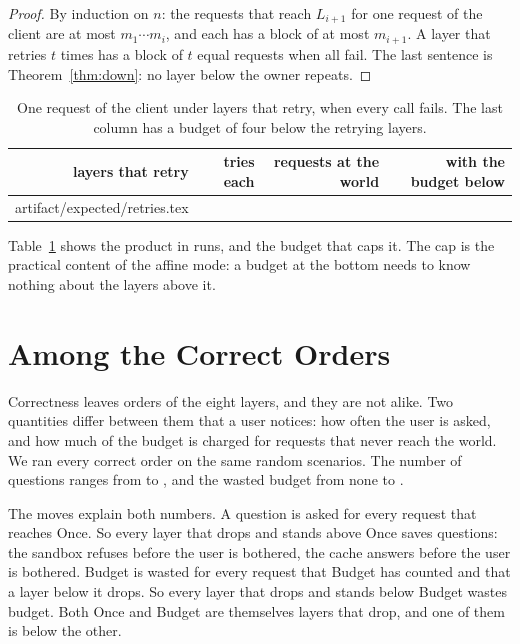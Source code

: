 \documentclass[acmsmall,nonacm,screen]{acmart}
\makeatletter
\newcommand{\ly}[1]{\textsf{#1}}
\newcommand{\claim}[2]{#2}
\newcommand{\rows}[1]{\@@input artifact/expected/#1.tex }
\makeatother
\begin{document}
\begin{proof}
By induction on $n$: the requests that reach $L_{i+1}$ for one request of the client are at
most $m_1 \cdots m_i$, and each has a block of at most $m_{i+1}$. A layer that retries $t$
times has a block of $t$ equal requests when all fail. The last sentence is
Theorem~\ref{thm:down}: no layer below the owner repeats.
\end{proof}

\begin{table}
\caption{One request of the client under layers that retry, when every call fails. The last
column has a budget of four below the retrying layers.}
\label{tab:retries}
\begin{tabular}{rrrr}
\toprule
layers that retry & tries each & requests at the world & with the budget below \\
\midrule
\rows{retries}
\bottomrule
\end{tabular}
\end{table}

\claim{retries-multiply}{Table~\ref{tab:retries} shows the product in runs, and the budget
that caps it.} The cap is the practical content of the affine mode: a budget at the bottom
needs to know nothing about the layers above it.

\section{Among the Correct Orders}
\label{sec:cost}

Correctness leaves \exEightGood{} orders of the eight layers, and they are not alike. Two
quantities differ between them that a user notices: how often the user is asked, and how
much of the budget is charged for requests that never reach the world. We ran every correct
order on the same \exWork{} random scenarios. The number of questions ranges from
\exAskedLeast{} to \exAskedMost{}, and the wasted budget from none to \exWasteMost{}.

The moves explain both numbers. A question is asked for every request that reaches
\ly{Once}. So every layer that drops and stands above \ly{Once} saves questions: the sandbox
refuses before the user is bothered, the cache answers before the user is bothered. Budget
is wasted for every request that \ly{Budget} has counted and that a layer below it drops. So
every layer that drops and stands below \ly{Budget} wastes budget. Both \ly{Once} and
\ly{Budget} are themselves layers that drop, and one of them is below the other.
\end{document}
